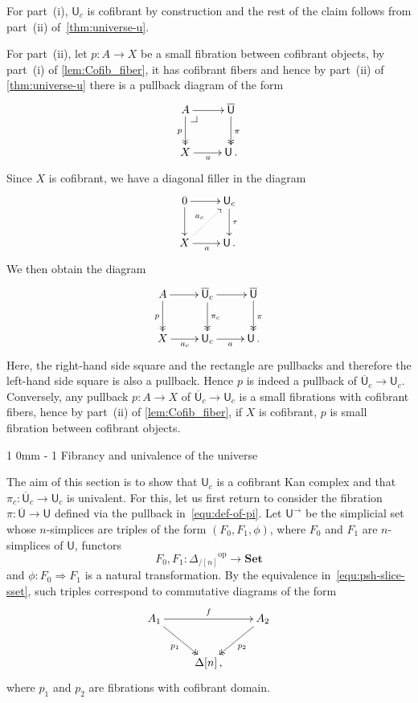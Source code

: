 \documentclass[reqno,10pt,a4paper,oneside]{amsart}
\makeatletter
\renewenvironment{proof}[1][\proofname] {\par\pushQED{\qed}\normalfont\topsep6\p@\@plus6\p@\relax\trivlist\item[\hskip\labelsep\bf#1\@addpunct{.}]\ignorespaces}{\popQED\endtrivlist\@endpefalse}
\renewcommand{\section}{\@startsection
{section}%
{1}%
{0mm}%
{-\baselineskip}%
{1\baselineskip}%
{\Large \bfseries}}%
\numberwithin{equation}{section}
\theoremstyle{mythm}
\theoremstyle{mydef}
\theoremstyle{myrmk}
\newcommand{\pullback}[1]{\save*!/#1-1.2pc/#1:(-1,1)@^{|-}\restore}
\newcommand{\drpullback}{\pullback{dr}}
\newcommand{\ie}{\text{i.e.\ }}
\newcommand{\co}{\colon}
\newcommand{\op}{\operatorname{op}}
\newcommand{\UU}{\overline{\mathsf{U}}}
\newcommand{\U}{\mathsf{U}}
\newcommand{\Set}{\mathbf{Set}}
\makeatother
\begin{document}
\begin{proof} For part~(i), $\U_c$ is cofibrant by construction and the rest of the claim follows from part~(ii) of~\cref{thm:universe-u}. 


For part~(ii), let $p \co A \to X$ be a small fibration between cofibrant objects, by part~(i) of \cref{lem:Cofib_fiber}, it has cofibrant fibers and hence by part~(ii) of \cref{thm:universe-u} there is a pullback diagram of the form 
\[
\xymatrix{
A \ar[r] \ar@{->>}[d]_p \drpullback & \UU \ar@{->>}[d]^{\pi} \\
X \ar[r]_a & \U \, . }
\]
Since $X$ is cofibrant, we have a diagonal filler in the diagram
\[
\xymatrix{
0 \ar[r] \ar[d] & \U_c \ar[d]^{\tau} \\
X \ar[r]_a \ar@{.>}[ur]^{a_c} & \U \, . }
\]
 We then obtain the diagram
\[
\xymatrix{
A \ar[r] \ar@{->>}[d]_p &  \UU_c \ar[r]  \ar@{->>}[d]^{\pi_c}  & \UU \ar@{->>}[d]^{\pi} \\
X \ar[r]_{a_c} & \U_c \ar[r]_{a} &  \U \, . }
\]
Here, the right-hand side square and the rectangle are pullbacks and therefore the left-hand
side square is also a pullback. Hence $p$ is indeed a pullback of $\UU_c \rightarrow \U_c$. Conversely, any pullback  $p \co A \rightarrow X$ of $\UU_c \rightarrow \U_c$ is a small fibrations with cofibrant fibers, hence by part~(ii) of \cref{lem:Cofib_fiber}, if $X$ is cofibrant, $p$ is small fibration between cofibrant objects.
\end{proof} 


\section{Fibrancy and univalence of the universe}
\label{sec:fibrancy-and-univalence}


The aim of this section is to show that $\U_c$ is a cofibrant Kan complex and that $\pi_c \co
\UU_c \to \U_c$ is univalent.  For this, let us first return to consider the fibration $\pi \co \UU \to \U$ defined
via the pullback in~\eqref{equ:def-of-pi}. Let $\U^{\rightarrow}$ be the simplicial set whose $n$-simplices are triples of the form $(F_0, F_1, \phi)$, where $F_0$ and $F_1$ are $n$-simplices of $\U$, \ie functors
 \[
F_0, F_1 \co {\Delta_{/[n]}}^{\op} \rightarrow \Set
\]
and $\phi \co F_0 \Rightarrow F_1$ is a natural transformation. By the equivalence in~\eqref{equ:psh-slice-sset},
such triples correspond to commutative diagrams of the form
\begin{equation}
\label{equ:corresp}
\begin{gathered}
\xymatrix{ 
A_1 \ar[rr]^{f} \ar@{->>}[dr]_{p_1} & & A_2 \ar@{->>}[dl]^{p_2} \\
& \Delta[n] \, , & }
\end{gathered}
\end{equation}
where $p_1$ and $p_2$ are fibrations with cofibrant domain.
\end{document}
